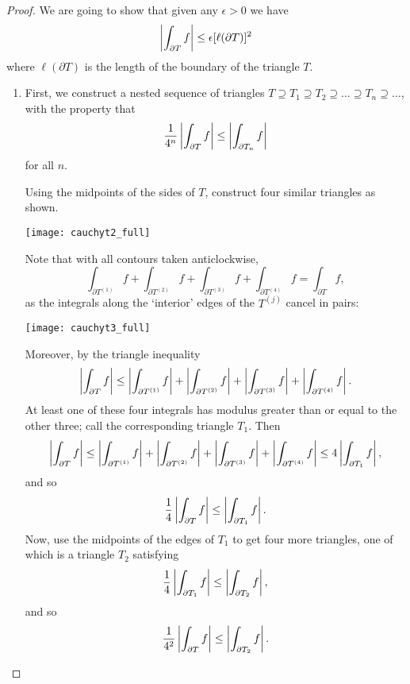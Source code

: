 \begin{proof}
We are going to show that given any $\epsilon>0$ we have
\[
\left|  \int_{\partial T} f  \right| \leq \epsilon [\ell (\partial T)]^2
\]
where $\ell ( \partial T )$ is the length of the boundary of the triangle $T$.

\begin{enumerate}
\item First, we construct a nested sequence of triangles $T \supseteq T_1 \supseteq T_2 \supseteq \ldots \supseteq T_n \supseteq \ldots$, with the property that
\[
\frac{1}{4^n} \left|  \int_{\partial T} f  \right| \leq \left|  \int_{\partial T_n} f  \right|
\]
for all $n$.


Using the midpoints of the sides of $T$, construct four similar triangles as shown.

\begin{center}
\texttt{[image: cauchyt2\_full]}
\end{center}
Note that with all contours taken anticlockwise,
\[
\int_{\partial T^{(1)}} f + \int_{\partial T^{(2)} } f + \int_{\partial T^{(3)}} f + \int_{\partial T^{(4)}} f = \int_{\partial T} f,
\]
as the integrals along the `interior' edges of the $T^{(j)}$ cancel in pairs:
\begin{center}
\texttt{[image: cauchyt3\_full]}
\end{center}

Moreover, by the triangle inequality
\[
\left| \int_{\partial T} f \right| \leq \left|  \int_{\partial T^{(1)}} f \right| + \left| \int_{\partial T^{(2)} } f  \right|+ \left| \int_{\partial T^{(3)}} f  \right|+ \left| \int_{\partial T^{(4)}} f  \right|. 
\]
At least one of these four integrals has modulus greater than or equal to the other three; call the corresponding triangle $T_1$.  Then
\[
\left| \int_{\partial T} f \right| \leq \left|  \int_{\partial T^{(1)}} f \right| + \left| \int_{\partial T^{(2)} } f  \right|+ \left| \int_{\partial T^{(3)}} f  \right|+ \left| \int_{\partial T^{(4)}} f  \right| \leq 4 \left|  \int_{\partial T_1} f \right|,
\]
and so
\[
\frac{1}{4} \left|  \int_{\partial T } f  \right| \leq \left| \int_{\partial T_1} f \right|.
\]
Now, use the midpoints of the edges of $T_1$ to get four more triangles, one of which is a triangle $T_2$ satisfying
\[
\frac{1}{4} \left|  \int_{\partial T_1} f  \right| \leq \left|  \int_{\partial T_2} f  \right|,
\]
and so
\[
\frac{1}{4^2} \left|  \int_{\partial T} f  \right| \leq \left|  \int_{\partial T_2} f  \right|.
\]


\end{enumerate}
\end{proof}
